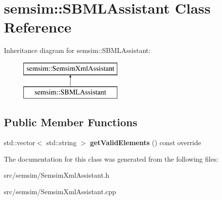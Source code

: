 \hypertarget{classsemsim_1_1SBMLAssistant}{}\section{semsim\+:\+:S\+B\+M\+L\+Assistant Class Reference}
\label{classsemsim_1_1SBMLAssistant}
Inheritance diagram for semsim\+:\+:S\+B\+M\+L\+Assistant\+:\begin{figure}[H]
\begin{center}
\leavevmode
\includegraphics[height=2.000000cm]{classsemsim_1_1SBMLAssistant}
\end{center}
\end{figure}
\subsection*{Public Member Functions}
\begin{DoxyCompactItemize}
\item 
\mbox{\label{classsemsim_1_1SBMLAssistant_a9e5e7db77689291f069dd8cbafa70296}} 
std\+::vector$<$ std\+::string $>$ {\bfseries get\+Valid\+Elements} () const override
\end{DoxyCompactItemize}


The documentation for this class was generated from the following files\+:\begin{DoxyCompactItemize}
\item 
src/semsim/Semsim\+Xml\+Assistant.\+h\item 
src/semsim/Semsim\+Xml\+Assistant.\+cpp\end{DoxyCompactItemize}
